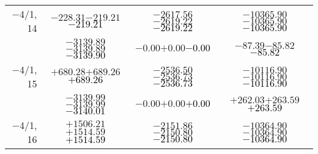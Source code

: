 \documentclass[compress]{beamer}
\begin{document}
\begin{frame}
{\begin{tabular}{r | c | c | c}
$-$4/1, 14 & $-228.31$\hspace{0.1 cm}$-219.21$\hspace{0.1 cm}\textcolor{black}{$-219.21$} & $-2617.56$\hspace{0.1 cm}$-2619.22$\hspace{0.1 cm}\textcolor{black}{$-2619.22$} & $-10365.90$\hspace{0.1 cm}$-10365.90$\hspace{0.1 cm}\textcolor{black}{$-10365.90$} \\
           & $-3139.89$\hspace{0.1 cm}$-3139.89$\hspace{0.1 cm}\textcolor{black}{$-3139.90$} & $-0.00$\hspace{0.1 cm}$+0.00$\hspace{0.1 cm}\textcolor{black}{$-0.00$} & $-87.39$\hspace{0.1 cm}$-85.82$\hspace{0.1 cm}\textcolor{black}{$-85.82$} \\
$-$4/1, 15 & $+680.28$\hspace{0.1 cm}$+689.26$\hspace{0.1 cm}\textcolor{black}{$+689.26$} & $-2536.50$\hspace{0.1 cm}$-2536.73$\hspace{0.1 cm}\textcolor{black}{$-2536.73$} & $-10116.90$\hspace{0.1 cm}$-10116.90$\hspace{0.1 cm}\textcolor{black}{$-10116.90$} \\
           & $-3139.99$\hspace{0.1 cm}$-3139.99$\hspace{0.1 cm}\textcolor{black}{$-3140.01$} & $-0.00$\hspace{0.1 cm}$+0.00$\hspace{0.1 cm}\textcolor{black}{$+0.00$} & $+262.03$\hspace{0.1 cm}$+263.59$\hspace{0.1 cm}\textcolor{black}{$+263.59$} \\
$-$4/1, 16 & $+1506.21$\hspace{0.1 cm}$+1514.59$\hspace{0.1 cm}\textcolor{black}{$+1514.59$} & $-2151.86$\hspace{0.1 cm}$-2150.80$\hspace{0.1 cm}\textcolor{black}{$-2150.80$} & $-10364.90$\hspace{0.1 cm}$-10364.90$\hspace{0.1 cm}\textcolor{black}{$-10364.90$} \\

\end{tabular}}
\end{frame}
\end{document}
